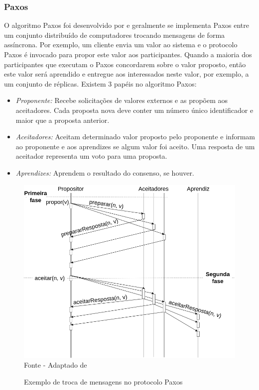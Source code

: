 
\subsubsection{Paxos}

O algoritmo Paxos foi desenvolvido por \textcite{lamport2001paxos} e geralmente se implementa Paxos entre um conjunto distribuído de computadores trocando mensagens de forma assíncrona. Por exemplo, um cliente envia um valor ao sistema e o protocolo Paxos é invocado para propor este valor aos participantes. Quando a maioria dos participantes que executam o Paxos concordarem sobre o valor proposto, então este valor será aprendido e entregue aos interessados neste valor, por exemplo, a um conjunto de réplicas. Existem 3 papéis no algoritmo Paxos:

\begin{itemize}
\item \textit{Proponente:} Recebe solicitações de valores externos e as propõem aos aceitadores. Cada proposta nova deve conter um número único identificador e maior que a proposta anterior.

\item \textit{Aceitadores:} Aceitam determinado valor proposto pelo proponente e informam ao proponente e aos aprendizes se algum valor foi aceito. Uma resposta de um aceitador representa um voto para uma proposta. 
\item \textit{Aprendizes:} Aprendem o resultado do consenso, se houver.
\end{itemize}

\begin{figure}[htb!]
\centering
\caption{Exemplo de troca de mensagens no protocolo Paxos}
\includegraphics[width=1\linewidth]{figures/paxos.png}
{\flushleft Fonte - Adaptado de \textcite{AcaciaTerra}}
\label{fig:protocolo:paxos}
\end{figure}

